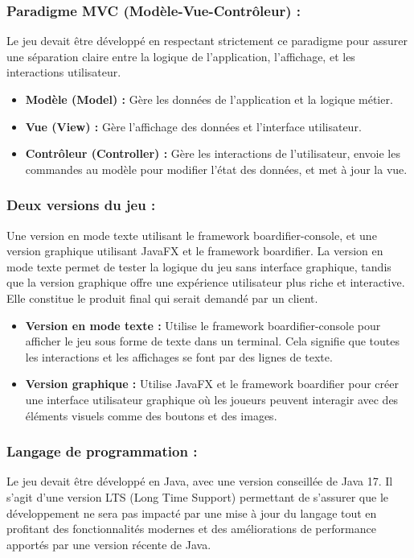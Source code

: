 \subsubsection*{Paradigme MVC (Modèle-Vue-Contrôleur) :}
Le jeu devait être développé en respectant strictement ce paradigme pour assurer une séparation claire entre la logique de l'application, l'affichage, et les interactions utilisateur.
\begin{itemize}
	\item \textbf{Modèle (Model) :} Gère les données de l'application et la logique métier.
	\item \textbf{Vue (View) :} Gère l'affichage des données et l'interface utilisateur.
	\item \textbf{Contrôleur (Controller) :} Gère les interactions de l'utilisateur, envoie les commandes au modèle pour modifier l'état des données, et met à jour la vue.
\end{itemize}
\subsubsection*{Deux versions du jeu :} 
Une version en mode texte utilisant le framework boardifier-console, et une version graphique utilisant JavaFX et le framework boardifier. La version en mode texte permet de tester la logique du jeu sans interface graphique, tandis que la version graphique offre une expérience utilisateur plus riche et interactive. Elle constitue le produit final qui serait demandé par un client.
\begin{itemize}
	\item \textbf{Version en mode texte :} Utilise le framework boardifier-console pour afficher le jeu sous forme de texte dans un terminal. Cela signifie que toutes les interactions et les affichages se font par des lignes de texte.
	\item \textbf{Version graphique :} Utilise JavaFX et le framework boardifier pour créer une interface utilisateur graphique où les joueurs peuvent interagir avec des éléments visuels comme des boutons et des images.
\end{itemize}
\subsubsection*{Langage de programmation :} 
Le jeu devait être développé en Java, avec une version conseillée de Java 17. Il s’agit d’une version LTS (Long Time Support) permettant de s’assurer que le développement ne sera pas impacté par une mise à jour du langage tout en profitant des fonctionnalités modernes et des améliorations de performance apportés par une version récente de Java.
